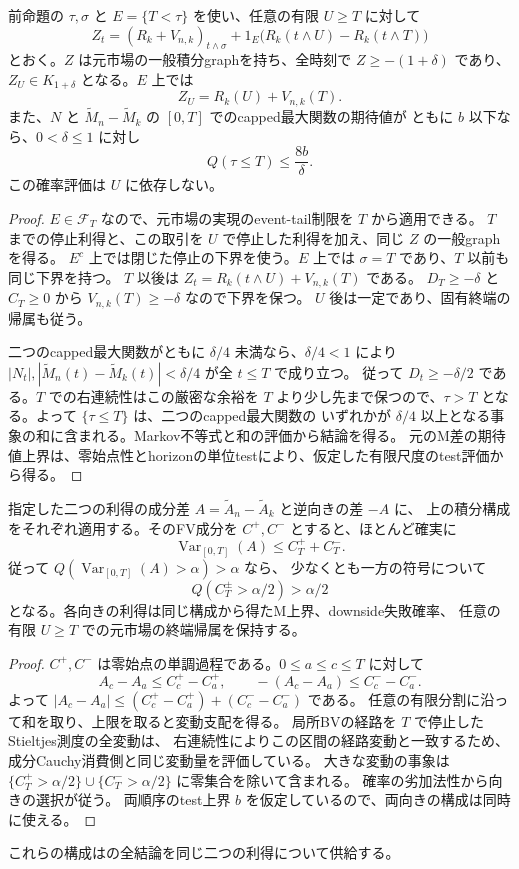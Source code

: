 \begin{proposition}[成功事象での元利得の継続と失敗確率]
前命題の $\tau,\sigma$ と $E=\{T<\tau\}$ を使い、任意の有限 $U\geq T$ に対して
\[
 Z_t=(R_k+V_{n,k})_{t\wedge\sigma}
       +1_E\bigl(R_k(t\wedge U)-R_k(t\wedge T)\bigr)
\]
とおく。$Z$ は元市場の一般積分graphを持ち、全時刻で $Z\geq-(1+\delta)$ であり、
$Z_U\in K_{1+\delta}$ となる。$E$ 上では
\[
 Z_U=R_k(U)+V_{n,k}(T).
\]
また、$N$ と $\widetilde M_n-\widetilde M_k$ の $[0,T]$ でのcapped最大関数の期待値が
ともに $b$ 以下なら、$0<\delta\leq1$ に対し
\[
 Q(\tau\leq T)\leq\frac{8b}{\delta}.
\]
この確率評価は $U$ に依存しない。
\end{proposition}
\begin{proof}
$E\in\mathcal F_T$ なので、元市場の実現のevent-tail制限を $T$ から適用できる。
$T$ までの停止利得と、この取引を $U$ で停止した利得を加え、同じ $Z$ の一般graphを得る。
$E^c$ 上では閉じた停止の下界を使う。$E$ 上では $\sigma=T$ であり、$T$ 以前も同じ下界を持つ。
$T$ 以後は $Z_t=R_k(t\wedge U)+V_{n,k}(T)$ である。
$D_T\geq-\delta$ と $C_T\geq0$ から $V_{n,k}(T)\geq-\delta$ なので下界を保つ。
$U$ 後は一定であり、固有終端の帰属も従う。

二つのcapped最大関数がともに $\delta/4$ 未満なら、$\delta/4<1$ により
$|N_t|,|\widetilde M_n(t)-\widetilde M_k(t)|<\delta/4$ が全 $t\leq T$ で成り立つ。
従って $D_t\geq-\delta/2$ である。$T$ での右連続性はこの厳密な余裕を
$T$ より少し先まで保つので、$\tau>T$ となる。よって $\{\tau\leq T\}$ は、二つのcapped最大関数の
いずれかが $\delta/4$ 以上となる事象の和に含まれる。Markov不等式と和の評価から結論を得る。
元のM差の期待値上界は、零始点性とhorizonの単位testにより、仮定した有限尺度のtest評価から得る。
\end{proof}

\begin{proposition}[両向きのHahn増分による変動支配と向きの選択]
指定した二つの利得の成分差 $A=\widetilde A_n-\widetilde A_k$ と逆向きの差 $-A$ に、
上の積分構成をそれぞれ適用する。そのFV成分を $C^+,C^-$ とすると、ほとんど確実に
\[
 \operatorname{Var}_{[0,T]}(A)\leq C^+_T+C^-_T.
\]
従って $Q(\operatorname{Var}_{[0,T]}(A)>\alpha)>\alpha$ なら、
少なくとも一方の符号について
\[
 Q(C^{\pm}_T>\alpha/2)>\alpha/2
\]
となる。各向きの利得は同じ構成から得たM上界、downside失敗確率、
任意の有限 $U\geq T$ での元市場の終端帰属を保持する。
\end{proposition}
\begin{proof}
$C^+,C^-$ は零始点の単調過程である。$0\leq a\leq c\leq T$ に対して
\[
 A_c-A_a\leq C^+_c-C^+_a,\qquad
 -(A_c-A_a)\leq C^-_c-C^-_a.
\]
よって $|A_c-A_a|\leq(C^+_c-C^+_a)+(C^-_c-C^-_a)$ である。
任意の有限分割に沿って和を取り、上限を取ると変動支配を得る。
局所BVの経路を $T$ で停止したStieltjes測度の全変動は、
右連続性によりこの区間の経路変動と一致するため、成分Cauchy消費側と同じ変動量を評価している。
大きな変動の事象は $\{C^+_T>\alpha/2\}\cup\{C^-_T>\alpha/2\}$ に零集合を除いて含まれる。
確率の劣加法性から向きの選択が従う。
両順序のtest上界 $b$ を仮定しているので、両向きの構成は同時に使える。
\end{proof}

これらの構成はの全結論を同じ二つの利得について供給する。

